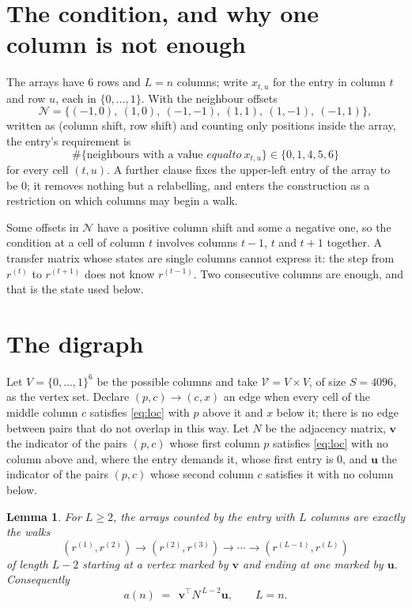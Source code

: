 \documentclass[11pt,a4paper]{article}
\theoremstyle{plain}
\newtheorem{lemma}[theorem]{Lemma}
\theoremstyle{definition}
\begin{document}
\section{The condition, and why one column is not enough}

The arrays have $6$ rows and $L=n$ columns; write $x_{t,u}$ for the entry in
column $t$ and row $u$, each in $\{0,\dots,1\}$. With the neighbour offsets
\[
\mathcal N=\{(-1,0),\ (1,0),\ (-1,-1),\ (1,1),\ (1,-1),\ (-1,1)\},
\]
written as (column shift, row shift) and counting only positions inside the array, the
entry's requirement is
\begin{equation}\label{eq:loc}
\#\{\text{neighbours with a value }equal to\ x_{t,u}\}\in\{0,1,4,5,6\}
\end{equation}
for every cell $(t,u)$. A further clause fixes the upper-left entry of the array to be $0$; it removes nothing but a relabelling, and enters the construction as a restriction on which columns may begin a walk.

Some offsets in $\mathcal N$ have a positive column shift and some a negative one, so the
condition at a cell of column $t$ involves columns $t-1$, $t$ and $t+1$ together. A transfer
matrix whose states are single columns cannot express it: the step from $r^{(t)}$ to
$r^{(t+1)}$ does not know $r^{(t-1)}$. Two consecutive columns are enough, and that is
the state used below.

\section{The digraph}

Let $V=\{0,\dots,1\}^{6}$ be the possible columns and take
$\mathcal V=V\times V$, of size $S=4096$, as the vertex set. Declare $(p,c)\to(c,x)$ an edge
when every cell of the middle column $c$ satisfies \eqref{eq:loc} with $p$ above it and $x$
below it; there is no edge between pairs that do not overlap in this way. Let $N$ be the
adjacency matrix, $\mathbf{v}$ the indicator of the pairs $(p,c)$ whose first column $p$
satisfies \eqref{eq:loc} with no column above and, where the entry demands it, whose first entry is $0$, and $\mathbf{u}$ the indicator of
the pairs $(p,c)$ whose second column $c$ satisfies it with no column below.

\begin{lemma}\label{lem:walk}
For $L\ge2$, the arrays counted by the entry with $L$ columns are exactly the walks
\[
(r^{(1)},r^{(2)})\to(r^{(2)},r^{(3)})\to\cdots\to(r^{(L-1)},r^{(L)})
\]
of length $L-2$ starting at a vertex marked by $\mathbf{v}$ and ending at one marked by
$\mathbf{u}$. Consequently
\[
a(n)\;=\;\,\mathbf{v}^{\!\top}N^{\,L-2}\mathbf{u},\qquad L=n .
\]
\end{lemma}
\end{document}
